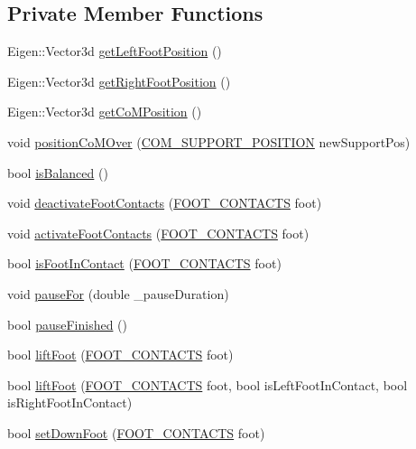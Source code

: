 \subsection*{Private Member Functions}
\begin{DoxyCompactItemize}
\item 
Eigen\+::\+Vector3d \hyperlink{classSteppingDemoClient_af6a814243828f5136476aa5e99ea0079}{get\+Left\+Foot\+Position} ()
\item 
Eigen\+::\+Vector3d \hyperlink{classSteppingDemoClient_ae9c0d72756c109f49c269a7e1b06454a}{get\+Right\+Foot\+Position} ()
\item 
Eigen\+::\+Vector3d \hyperlink{classSteppingDemoClient_a857aa530a4ab94443d0b0869121baf76}{get\+Co\+M\+Position} ()
\item 
void \hyperlink{classSteppingDemoClient_a18609e5634a283423c228106bb0e3a45}{position\+Co\+M\+Over} (\hyperlink{SteppingDemoClient_8h_ac0c3848a609566394821d9826e0fdd5b}{C\+O\+M\+\_\+\+S\+U\+P\+P\+O\+R\+T\+\_\+\+P\+O\+S\+I\+T\+I\+ON} new\+Support\+Pos)
\item 
bool \hyperlink{classSteppingDemoClient_ad8fbc186267a47a73bb77e78199f2b8c}{is\+Balanced} ()
\item 
void \hyperlink{classSteppingDemoClient_a62b5028bdc99de117cfffc576478a0f1}{deactivate\+Foot\+Contacts} (\hyperlink{SteppingDemoClient_8h_ab0673d7f17cdd57b8fa124abb330287f}{F\+O\+O\+T\+\_\+\+C\+O\+N\+T\+A\+C\+TS} foot)
\item 
void \hyperlink{classSteppingDemoClient_abf583698c8c03620516acf3ec6eb9e41}{activate\+Foot\+Contacts} (\hyperlink{SteppingDemoClient_8h_ab0673d7f17cdd57b8fa124abb330287f}{F\+O\+O\+T\+\_\+\+C\+O\+N\+T\+A\+C\+TS} foot)
\item 
bool \hyperlink{classSteppingDemoClient_aeeaa9fac47e3e5a141647b07fa2feaa3}{is\+Foot\+In\+Contact} (\hyperlink{SteppingDemoClient_8h_ab0673d7f17cdd57b8fa124abb330287f}{F\+O\+O\+T\+\_\+\+C\+O\+N\+T\+A\+C\+TS} foot)
\item 
void \hyperlink{classSteppingDemoClient_a6b5d8bf0ce08c8b9f66ac2c1bbd5bcd7}{pause\+For} (double \+\_\+pause\+Duration)
\item 
bool \hyperlink{classSteppingDemoClient_afe78b799d8b8c63cff7d1e8765b7e1fa}{pause\+Finished} ()
\item 
bool \hyperlink{classSteppingDemoClient_a927c8615104a5fd5968ea4ece2c22926}{lift\+Foot} (\hyperlink{SteppingDemoClient_8h_ab0673d7f17cdd57b8fa124abb330287f}{F\+O\+O\+T\+\_\+\+C\+O\+N\+T\+A\+C\+TS} foot)
\item 
bool \hyperlink{classSteppingDemoClient_ae406e5c8f755f234272b63de4d6a774f}{lift\+Foot} (\hyperlink{SteppingDemoClient_8h_ab0673d7f17cdd57b8fa124abb330287f}{F\+O\+O\+T\+\_\+\+C\+O\+N\+T\+A\+C\+TS} foot, bool is\+Left\+Foot\+In\+Contact, bool is\+Right\+Foot\+In\+Contact)
\item 
bool \hyperlink{classSteppingDemoClient_a930123dad5658ea8a3bb5f23cb4cb369}{set\+Down\+Foot} (\hyperlink{SteppingDemoClient_8h_ab0673d7f17cdd57b8fa124abb330287f}{F\+O\+O\+T\+\_\+\+C\+O\+N\+T\+A\+C\+TS} foot)
\end{DoxyCompactItemize}
